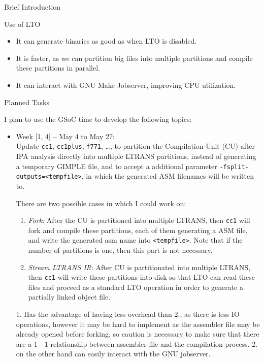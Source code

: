\documentclass[12pt]{article}
\begin{document}
\begin{section}{Brief Introduction}
\begin{section}{Use of LTO}
\begin{itemize}

    \item It can generate binaries as good as when LTO is disabled.
    \item It is faster, as we can partition big files into multiple partitions
    and compile these partitions in parallel.
    \item It can interact with GNU Make Jobserver, improving CPU utilization.

\end{itemize}

\end{section}

\begin{section}{Planned Tasks}

I plan to use the GSoC time to develop the following topics:

\begin{itemize}
 \item{Week [1, 4] -- May 4 to May 27:} \\
  Update \texttt{cc1}, \texttt{cc1plus}, \texttt{f771}, \ldots, to partition
  the Compilation Unit (CU) after IPA analysis directly into multiple LTRANS
  partitions, instead of generating a temporary GIMPLE file, and to accept a
  additional parameter \texttt{-fsplit-outputs=<tempfile>}, in which the
  generated ASM filenames will be written to.

  There are two possible cases in which I could work on:
  \begin{enumerate}
    \item \textit{Fork}: After the CU is partitioned into multiple LTRANS, then
    \texttt{cc1} will fork and compile these partitions, each of them
    generating a ASM file, and write the generated asm name into
    \texttt{<tempfile>}.  Note that if the number of partitions is one, then
    this part is not necessary.

    \item \textit{Stream LTRANS IR}: After CU is partitionated into multiple
    LTRANS, then \texttt{cc1} will write these partitions into disk so that LTO
    can read these files and proceed as a standard LTO operation in order to
    generate a partially linked object file.
  \end{enumerate}

  1. Has the advantage of having less overhead than 2., as there is less IO operations,
  however it may be hard to implement as the assembler file may be already
  opened before forking, so caution is necessary to make sure that there are a
  1 - 1 relationship between assembler file and the compilation process. 2.
  on the other hand can easily interact with the GNU jobserver.


\end{itemize}
\end{section}
\end{section}
\end{document}

